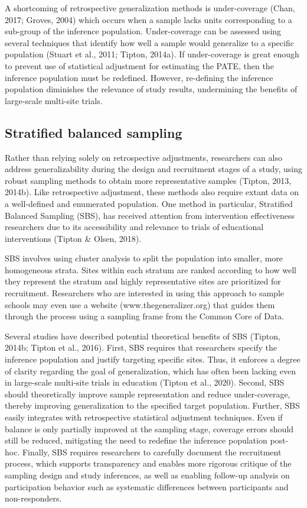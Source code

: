 \documentclass[
  english,
  man,floatsintext]{apa6}
\begin{document}
A shortcoming of retrospective generalization methods is under-coverage (Chan, 2017; Groves, 2004) which occurs when a sample lacks units corresponding to a sub-group of the inference population. Under-coverage can be assessed using several techniques that identify how well a sample would generalize to a specific population (Stuart et al., 2011; Tipton, 2014a). If under-coverage is great enough to prevent use of statistical adjustment for estimating the PATE, then the inference population must be redefined. However, re-defining the inference population diminishes the relevance of study results, undermining the benefits of large-scale multi-site trials.

\hypertarget{stratified-balanced-sampling}{%
\subsection{Stratified balanced sampling}\label{stratified-balanced-sampling}}

Rather than relying solely on retrospective adjustments, researchers can also address generalizability during the design and recruitment stages of a study, using robust sampling methods to obtain more representative samples (Tipton, 2013, 2014b). Like retrospective adjustment, these methods also require extant data on a well-defined and enumerated population.
One method in particular, Stratified Balanced Sampling (SBS), has received attention from intervention effectiveness researchers due to its accessibility and relevance to trials of educational interventions (Tipton \& Olsen, 2018).

SBS involves using cluster analysis to split the population into smaller, more homogeneous strata. Sites within each stratum are ranked according to how well they represent the stratum and highly representative sites are prioritized for recruitment.
Researchers who are interested in using this approach to sample schools may even use a website (www.thegeneralizer.org) that guides them through the process using a sampling frame from the Common Core of Data.

Several studies have described potential theoretical benefits of SBS (Tipton, 2014b; Tipton et al., 2016). First, SBS requires that researchers specify the inference population and justify targeting specific sites. Thus, it enforces a degree of clarity regarding the goal of generalization, which has often been lacking even in large-scale multi-site trials in education (Tipton et al., 2020). Second, SBS should theoretically improve sample representation and reduce under-coverage, thereby improving generalization to the specified target population. Further, SBS easily integrates with retrospective statistical adjustment techniques. Even if balance is only partially improved at the sampling stage, coverage errors should still be reduced, mitigating the need to redefine the inference population post-hoc.
Finally, SBS requires researchers to carefully document the recruitment process, which supports transparency and enables more rigorous critique of the sampling design and study inferences, as well as enabling follow-up analysis on participation behavior such as systematic differences between participants and non-responders.
\end{document}
